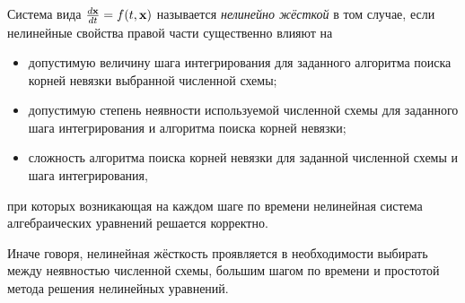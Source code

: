 \begin{definition}
    \label{def:nonlinear_stiffness}
    Система вида $ \frac{d \mathbf{x}}{d t} = f(t, \mathbf{x}) $ называется \emph{нелинейно жёсткой} в том случае,
    если нелинейные свойства правой части существенно влияют на
    \begin{itemize}[itemsep=0em]
        \item
            допустимую величину шага интегрирования для заданного алгоритма поиска корней невязки выбранной численной схемы;
        \item
            допустимую степень неявности используемой численной схемы для заданного шага интегрирования и алгоритма поиска корней невязки;
        \item
            сложность алгоритма поиска корней невязки для заданной численной схемы и шага интегрирования,
    \end{itemize}
    при которых возникающая на каждом шаге по времени нелинейная система алгебраических уравнений решается корректно.
\end{definition}

Иначе говоря, нелинейная жёсткость проявляется в необходимости выбирать между неявностью численной схемы,
большим шагом по времени и простотой метода решения нелинейных уравнений.

